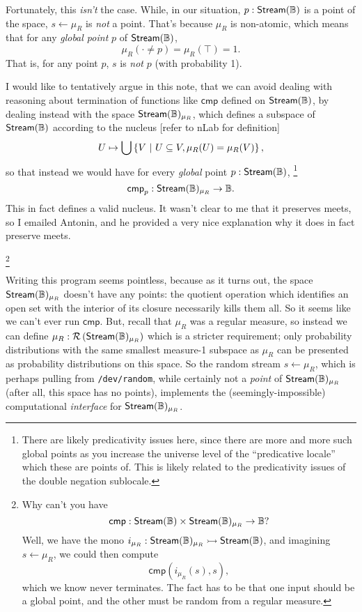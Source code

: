 Fortunately, this \emph{isn't} the case. While, in our situation, $p : \mathsf{Stream}(\mathbb{B})$ is a point of the space, $s \leftarrow \mu_R$ is \emph{not} a point. That's because $\mu_R$ is non-atomic, which means that for any \emph{global point} $p$ of $\mathsf{Stream}(\mathbb{B})$,
\[
\mu_R(\cdot \neq p) = \mu_R(\top) = 1.
\]
That is, for any point $p$, $s$ is \emph{not} $p$ (with probability 1).

I would like to tentatively argue in this note, that we can avoid dealing with reasoning about termination of functions like $\mathsf{cmp}$ defined on $\mathsf{Stream}(\mathbb{B})$, by dealing instead with the space $\mathsf{Stream}(\mathbb{B})_{\mu_R}$, which defines a subspace of $\mathsf{Stream}(\mathbb{B})$ according to the nucleus [refer to nLab for definition]
\[
U \mapsto \bigcup \left\{ V \ |\  U \subseteq V, \mu_R(U) = \mu_R(V) \right\},
\]
so that instead we would have for every \emph{global} point $p : \mathsf{Stream}(\mathbb{B})$,
\footnote{There are likely predicativity issues here, since there are more and more such global points as you increase the universe level of the ``predicative locale'' which these are points of. This is likely related to the predicativity issues of the double negation sublocale.}
\[
\mathsf{cmp}_p : \mathsf{Stream}(\mathbb{B})_{\mu_R} \to \mathbb{B}.
\]
This in fact defines a valid nucleus. It wasn't clear to me that it preserves meets, so I emailed Antonin, and he provided a very nice explanation why it does in fact preserve meets.

\footnote{Why can't you have 
\[
\mathsf{cmp} :  \mathsf{Stream}(\mathbb{B}) \times \mathsf{Stream}(\mathbb{B})_{\mu_R} \to \mathbb{B}?
\]
Well, we have the mono $i_{\mu_R} : \mathsf{Stream}(\mathbb{B})_{\mu_R} \rightarrowtail \mathsf{Stream}(\mathbb{B})$, and imagining $s \leftarrow \mu_R$, we could then compute
\[
\mathsf{cmp}(i_{\mu_R}(s), s),
\]
which we know never terminates. The fact has to be that one input should be a global point, and the other must be random from a regular measure.}

Writing this program seems pointless, because as it turns out, the space $\mathsf{Stream}(\mathbb{B})_{\mu_R}$ doesn't have any points: the quotient operation which identifies an open set with the interior of its closure necessarily kills them all. So it seems like we can't ever run $\mathsf{cmp}$. But, recall that $\mu_R$ was a regular measure, so instead we can define $\mu_R : \mathcal{R}\left(\mathsf{Stream}(\mathbb{B})_{\mu_R} \right)$ which is a stricter requirement; only probability distributions with the same smallest measure-1 subspace as $\mu_R$ can be presented as probability distributions on this space. So the random stream $s \leftarrow \mu_R$, which is perhaps pulling from \texttt{/dev/random}, while certainly not a \emph{point} of $\mathsf{Stream}(\mathbb{B})_{\mu_R}$ (after all, this space has no points), implements the (seemingly-impossible) computational \emph{interface} for $\mathsf{Stream}(\mathbb{B})_{\mu_R}$.

